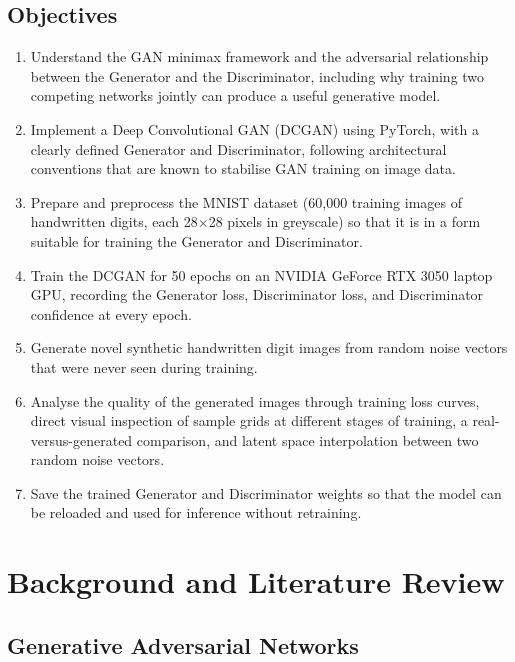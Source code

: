 \documentclass[12pt,a4paper]{article}
\begin{document}
\subsection{Objectives}

\begin{enumerate}
    \item Understand the GAN minimax framework and the adversarial relationship between
          the Generator and the Discriminator, including why training two competing
          networks jointly can produce a useful generative model.
    \item Implement a Deep Convolutional GAN (DCGAN) using PyTorch, with a clearly
          defined Generator and Discriminator, following architectural conventions that
          are known to stabilise GAN training on image data.
    \item Prepare and preprocess the MNIST dataset (60,000 training images of
          handwritten digits, each 28$\times$28 pixels in greyscale) so that it is in a
          form suitable for training the Generator and Discriminator.
    \item Train the DCGAN for 50 epochs on an NVIDIA GeForce RTX 3050 laptop GPU,
          recording the Generator loss, Discriminator loss, and Discriminator confidence
          at every epoch.
    \item Generate novel synthetic handwritten digit images from random noise vectors
          that were never seen during training.
    \item Analyse the quality of the generated images through training loss curves,
          direct visual inspection of sample grids at different stages of training, a
          real-versus-generated comparison, and latent space interpolation between two
          random noise vectors.
    \item Save the trained Generator and Discriminator weights so that the model can be
          reloaded and used for inference without retraining.
\end{enumerate}

\section{Background and Literature Review}

\subsection{Generative Adversarial Networks}
\end{document}

